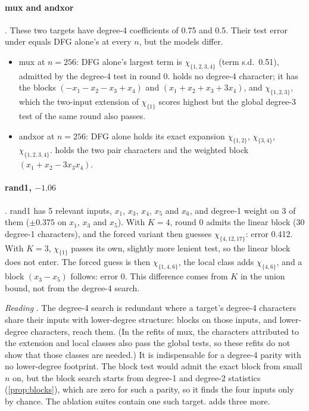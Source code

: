 \paragraph{mux and andxor} . These two targets have degree-4 coefficients of 0.75 and 0.5. Their test error under  equals DFG alone's at every $n$, but the models differ.
\begin{itemize}
\item mux at $n=256$: DFG alone's largest term is $\chi_{\{1,2,3,4\}}$ (term s.d.\ 0.51), admitted by the degree-4 test in round 0.  holds no degree-4 character; it has the blocks $(-x_1-x_2-x_3+x_4)$ and $(x_1+x_2+x_3+3x_4)$, and $\chi_{\{1,2,3\}}$, which the two-input extension of $\chi_{\{1\}}$ scores highest but the global degree-3 test of the same round also passes.
\item andxor at $n=256$: DFG alone holds its exact expansion $\chi_{\{1,2\}}$, $\chi_{\{3,4\}}$, $\chi_{\{1,2,3,4\}}$.  holds the two pair characters and the weighted block $(x_1+x_2-3x_3x_4)$.
\end{itemize}

\paragraph{rand1, $-1.06$} . rand1 has 5 relevant inputs, $x_1$, $x_3$, $x_4$, $x_5$ and $x_6$, and degree-1 weight on 3 of them ($\pm0.375$ on $x_1$, $x_3$ and $x_5$). With $K=4$, round 0 admits the linear block (30 degree-1 characters), and the forced variant then guesses $\chi_{\{4,12,17\}}$: error 0.412. With $K=3$, $\chi_{\{1\}}$ passes its own, slightly more lenient test, so the linear block does not enter. The forced guess is then $\chi_{\{1,4,6\}}$, the local class adds $\chi_{\{4,6\}}$, and a block $(x_3-x_5)$ follows: error 0. This difference comes from $K$ in the union bound, not from the degree-4 search.

\emph{Reading} . The degree-4 search is redundant where a target's degree-4 characters share their inputs with lower-degree structure: blocks on those inputs, and lower-degree characters, reach them. (In the refits of mux, the characters attributed to the extension and local classes also pass the global tests, so these refits do not show that those classes are needed.) It is indispensable for a degree-4 parity with no lower-degree footprint. The block test would admit the exact block from small $n$ on, but the block search starts from degree-1 and degree-2 statistics (\cref{prop:blocks}), which are zero for such a parity, so it finds the four inputs only by chance. The ablation suites contain one such target.  adds three more.

